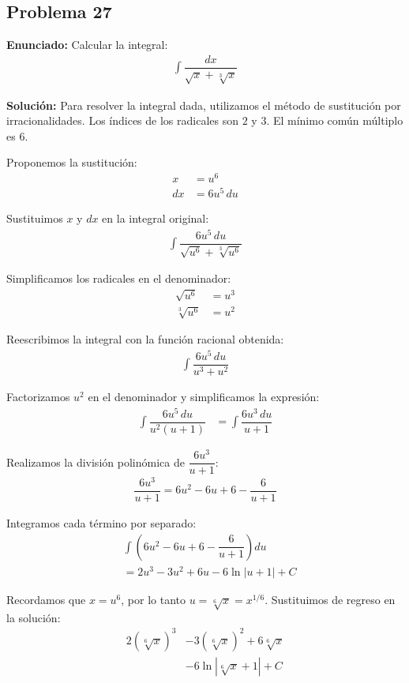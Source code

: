 \subsection*{Problema 27}

\textbf{Enunciado:} Calcular la integral:
\begin{align*}
  \int \dfrac{dx}{\sqrt{x} + \sqrt[3]{x}}
\end{align*}

\textbf{Solución:} Para resolver la integral dada, utilizamos el método de sustitución por irracionalidades. Los índices de los radicales son $2$ y $3$. El mínimo común múltiplo es $6$.

Proponemos la sustitución:
\begin{align*}
  x &= u^6 \\
  dx &= 6u^5 \, du
\end{align*}

Sustituimos $x$ y $dx$ en la integral original:
\begin{align*}
  \int \dfrac{6u^5 \, du}{\sqrt{u^6} + \sqrt[3]{u^6}}
\end{align*}

Simplificamos los radicales en el denominador:
\begin{align*}
  \sqrt{u^6} &= u^3 \\
  \sqrt[3]{u^6} &= u^2
\end{align*}

Reescribimos la integral con la función racional obtenida:
\begin{align*}
  \int \dfrac{6u^5 \, du}{u^3 + u^2}
\end{align*}

Factorizamos $u^2$ en el denominador y simplificamos la expresión:
\begin{align*}
  \int \dfrac{6u^5 \, du}{u^2(u + 1)} &= \int \dfrac{6u^3 \, du}{u + 1}
\end{align*}

Realizamos la división polinómica de $\dfrac{6u^3}{u + 1}$:
\begin{align*}
  \dfrac{6u^3}{u + 1} = 6u^2 - 6u + 6 - \dfrac{6}{u + 1}
\end{align*}

Integramos cada término por separado:
\begin{align*}
  &\int \left( 6u^2 - 6u + 6 - \dfrac{6}{u + 1} \right) du \\
  &= 2u^3 - 3u^2 + 6u - 6\ln|u + 1| + C
\end{align*}

Recordamos que $x = u^6$, por lo tanto $u = \sqrt[6]{x} = x^{1/6}$. Sustituimos de regreso en la solución:
\begin{align*}
  2(\sqrt[6]{x})^3 &- 3(\sqrt[6]{x})^2 + 6\sqrt[6]{x} \\
  &- 6\ln|\sqrt[6]{x} + 1| + C
\end{align*}

